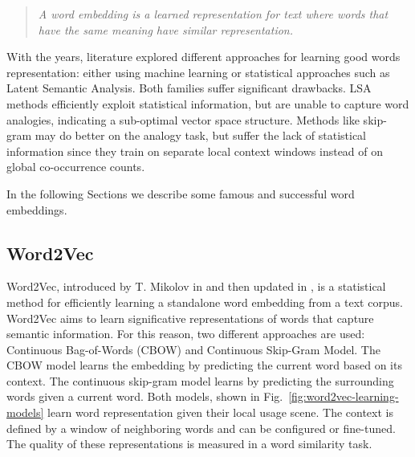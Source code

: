 \begin{quote}
  \textit{A word embedding is a learned representation for text where
  words that have the same meaning have similar representation.}
\end{quote}

With the years, literature explored different approaches for learning
good words representation: either using machine learning or
statistical approaches such as Latent Semantic Analysis. Both families
suffer significant drawbacks. LSA methods efficiently exploit
statistical information, but are unable to capture word analogies,
indicating a sub-optimal vector space structure. Methods like
skip-gram may do better on the analogy task, but suffer the lack of
statistical information since they train on separate local context
windows instead of on global co-occurrence counts.

In the following Sections we describe some famous and successful word
embeddings.

\subsection{Word2Vec}

Word2Vec, introduced by T. Mikolov in \cite{mikolov2013efficient} and
then updated in \cite{mikolov2013distributed, mikolov2013linguistic},
is a statistical method for efficiently learning a standalone word
embedding from a text corpus. Word2Vec aims to learn significative
representations of words that capture semantic information. For this
reason, two different approaches are used: Continuous Bag-of-Words
(CBOW) and Continuous Skip-Gram Model. The CBOW model learns the
embedding by predicting the current word based on its context. The
continuous skip-gram model learns by predicting the surrounding words
given a current word. Both models, shown in
Fig.~\ref{fig:word2vec-learning-models} learn word representation
given their local usage scene. The context is defined by a window of
neighboring words and can be configured or fine-tuned. The quality of
these representations is measured in a word similarity task.

